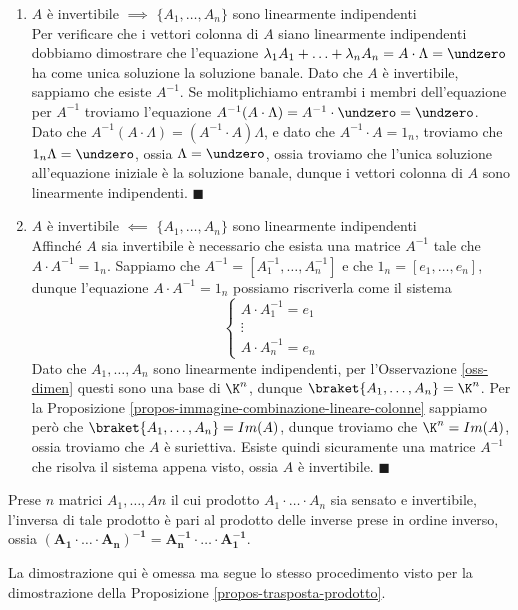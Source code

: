 \documentclass[11pt, a4paper, titlepage, oneside]{scrbook}
\begin{document}
\begin{enumerate}[label=\arabic*°]
    \item $A$ è invertibile $\implies$ $\{A_1, \ldots, A_n\}$ sono linearmente indipendenti \\
    Per verificare che i vettori colonna di $A$ siano linearmente indipendenti dobbiamo dimostrare che l'equazione $\lambda_1 A_1 + \ldots + \lambda_n A_n = A \cdot \Lambda = \undzero$ ha come unica soluzione la soluzione banale. Dato che $A$ è invertibile, sappiamo che esiste $A^{-1}$. Se molitplichiamo entrambi i membri dell'equazione per $A^{-1}$ troviamo l'equazione $A^{-1}(A \cdot \Lambda) = A^{-1} \cdot \undzero = \undzero$. Dato che $A^{-1}(A \cdot \Lambda) = (A^{-1} \cdot A)\Lambda$, e dato che $A^{-1} \cdot A = 1_n$, troviamo che $1_n \Lambda = \undzero$, ossia $\Lambda = \undzero$, ossia troviamo che l'unica soluzione all'equazione iniziale è la soluzione banale, dunque i vettori colonna di $A$ sono linearmente indipendenti. $\blacksquare$
    \item $A$ è invertibile $\impliedby$ $\{A_1, \ldots, A_n\}$ sono linearmente indipendenti \\
    Affinché $A$ sia invertibile è necessario che esista una matrice $A^{-1}$ tale che $A \cdot A^{-1} = 1_n$. Sappiamo che $A^{-1} = [A_1^{-1}, \ldots, A_n^{-1}]$ e che $1_n = [e_1, \ldots, e_n]$, dunque l'equazione $A \cdot A^{-1} = 1_n$ possiamo riscriverla come il sistema
    \[
    \begin{cases}
    A \cdot A_1^{-1} = e_1 \\
    \vdots \\
    A \cdot A_n^{-1} = e_n 
    \end{cases}
    \]
    Dato che $A_1, \ldots, A_n$ sono linearmente indipendenti, per l'Osservazione \ref{oss-dimen} questi sono una base di $\K^n$, dunque $\braket{A_1, \ldots, A_n} = \K^n$. Per la Proposizione \ref{propos-immagine-combinazione-lineare-colonne} sappiamo però che $\braket{A_1, \ldots, A_n} = Im(A)$, dunque troviamo che $\K^n = Im(A)$, ossia troviamo che $A$ è suriettiva. Esiste quindi sicuramente una matrice $A^{-1}$ che risolva il sistema appena visto, ossia $A$ è invertibile. $\blacksquare$
\end{enumerate}

\begin{Proposizione}
\label{propos-inversa-prodotto}
Prese $n$ matrici $A_1, \ldots, An$ il cui prodotto $A_1 \cdot \ldots \cdot A_n$ sia sensato e invertibile, l'inversa di tale prodotto è pari al prodotto delle inverse prese in ordine inverso, ossia $\bm{(A_1 \cdot \ldots \cdot A_n)^{-1} = A_n^{-1} \cdot \ldots \cdot A_1^{-1}}$.
\end{Proposizione}
La dimostrazione qui è omessa ma segue lo stesso procedimento visto per la dimostrazione della Proposizione \ref{propos-trasposta-prodotto}.
\end{document}
